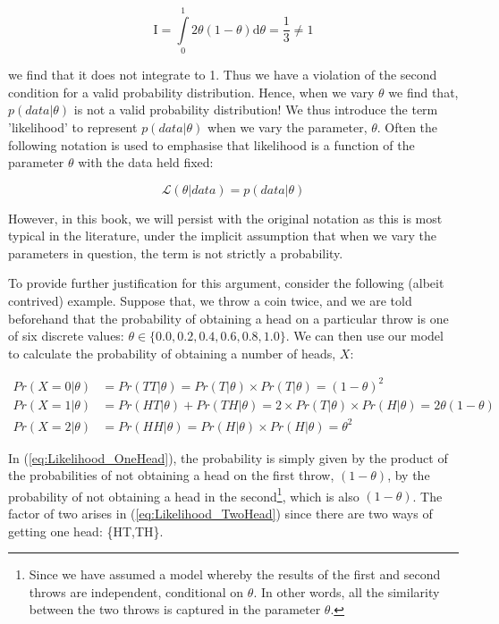 \documentclass[11pt,fullpage]{book}
\begin{document}
\begin{equation}
\mathrm{I} = \int\limits_{0}^{1} 2\theta(1-\theta)\mathrm{d}\theta = \frac{1}{3} \neq 1
\end{equation}

we find that it does not integrate to 1. Thus we have a violation of the second condition for a valid probability distribution. Hence, when we vary $\theta$ we find that, $p(data|\theta)$ is not a valid probability distribution! We thus introduce the term 'likelihood' to represent $p(data|\theta)$ when we vary the parameter, $\theta$. Often the following notation is used to emphasise that likelihood is a function of the parameter $\theta$ with the data held fixed:

\begin{equation}\label{eq:Likelihood_notation}
\mathcal{L}(\theta|data) = p(data|\theta)
\end{equation}

However, in this book, we will persist with the original notation as this is most typical in the literature, under the implicit assumption that when we vary the parameters in question, the term is not strictly a probability.

To provide further justification for this argument, consider the following (albeit contrived) example. Suppose that, we throw a coin twice, and we are told beforehand that the probability of obtaining a head on a particular throw is one of six discrete values: $\theta\in\{0.0,0.2,0.4,0.6,0.8,1.0\}$. We can then use our model to calculate the probability of obtaining a number of heads, $X$:

\begin{align}\label{eq:Likelihood_OneHead}
Pr(X = 0|\theta)& = Pr(TT|\theta) = Pr(T|\theta)\times Pr(T|\theta) = (1-\theta)^2\\
Pr(X = 1|\theta)& = Pr(HT|\theta) + Pr(TH|\theta) = 2\times Pr(T|\theta)\times Pr(H|\theta) = 2\theta(1-\theta)\\\label{eq:Likelihood_TwoHead}
Pr(X = 2|\theta)& = Pr(HH|\theta) = Pr(H|\theta)\times Pr(H|\theta) = \theta^2
\end{align}

In (\ref{eq:Likelihood_OneHead}), the probability is simply given by the product of the probabilities of not obtaining a head on the first throw, $(1-\theta)$, by the probability of not obtaining a head in the second\footnote{Since we have assumed a model whereby the results of the first and second throws are independent, conditional on $\theta$. In other words, all the similarity between the two throws is captured in the parameter $\theta$.}, which is also $(1-\theta)$. The factor of two arises in (\ref{eq:Likelihood_TwoHead}) since there are two ways of getting one head: \{HT,TH\}.
\end{document}
